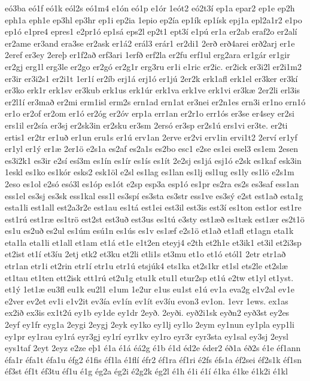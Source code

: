 {eó3ba
eó1f
eó1k
eól2s
eó1m4
e1ón
eó1p
e1ór
1eót2
eó2t3í
ep1a
epar2
ep1e
ep2h
eph1a
eph1e
ep3hl
ep3hr
ep1i
ep2ia
1epio
ep2ía
ep1ík
ep1ísk
epj1a
epl2a1r2
e1po
ep1ó
e1pre4
epres1
e2pr1ó
ep1sá
eps2l
ep2t1
ept3í
e1pú
er1a
er2ab
eraf2o
er2alí
er2ame
er3and
era3se
er2ask
er1á2
erál3
erár1
er2di1
2erð
erð4arei
erð2arj
er1e
2eref
er3ey
2ereþ
er1f2að
erf3ari
1erfð
erf2la
er2fu
erf1ul
erg2ara
er1gár
er1gir
er2gj
erg1l
erg3le
er2go
er2gó
er2g1r
erg3ru
er1i
e1ric
er2ic.
er2ick
er3i2l
er2i1m2
er3ir
er3i2s1
er2i1t
1er1í
er2íb
erj1á
erj1ó
er1jú
2er2k
erk1afl
erk1el
er3ker
er3kí
er3ko
erk1r
erk1sv
er3kub
erk1us
erk1úr
erk1va
erk1ve
erk1vi
er3kæ
2er2li
erl3is
er2l1í
er3mað
er2mi
erm1isl
erm2s
ern1ad
ern1at
er3nei
er2n1es
ern3i
er1no
ern1ó
er1o
er2of
er2om
er1ó
er2óg
er2óv
erp1a
err1an
er2r1o
err1ós
er3se
er4sey
er2si
ers1il
er2sía
er3sj
er2sk3in
er2sku
er3sm
2ersó
er3sp
er2s1ú
ers1vi
er3te.
er2ti
ertis1
er2tr
er1uð
er1un
eru1s
er1ú
erv1an
2erve
er2vi
erv1in
ervi1t2
2erví
er1yf
er1yl
er1ý
er1æ
2er1ö
e2s1a
es2af
es2a1s
es2bo
esc1
e2se
es1ei
esel3
es1em
2esen
es3i2k1
es3ir
e2sí
esí3m
es1ín
es1ír
es1ís
es1ít
2e2sj
es1já
esj1ó
e2sk
es1kaf
esk3in
1eskl
es1ko
es1kór
esks2
esk1öl
e2sl
es1lag
es1lan
es1lj
esl1ug
es1ly
es1lö
e2s1m
2eso
es1ol
e2só
esó3l
es1óp
es1ót
e2sp
esp3a
esp1ó
es1pr
es2ra
es2s
es3saf
ess1an
ess1el
es3sj
es3sk
ess1kal
ess1l
es3spí
es3sta
es3str
ess1ve
es3sý
e2st
est1að
esta1g
esta1li
est1all
est2a3r2e
est1au
es1tá
est1ei
est3il
est3is
est3í
es1ton
est1or
est1re
est1rú
est1ræ
es1trö
est2st
est3uð
est3us
es1tú
e3sty
est1æð
es1tæk
est1ær
es2t1ö
es1u
es2uð
es2ul
es1úm
esú1n
es1ús
es1v
es1æf
e2s1ö
et1að
et1afl
et1agn
eta1k
eta1la
eta1li
et1all
et1am
et1á
et1e
e1t2en
eteyj4
e2th
et2h1e
et3ik1
et3il
et2i3sp
et2ist
et1í
et3íu
2etj
etk2
et3ku
et2li
etli1s
et3mu
et1o
et1ó
etól1
2etr
etr1að
etr1an
etr1i
et2rin
etr1í
etr1u
etr1ú
etsjúk4
ets1ka
et2s1kr
et1sl
ets2le
et2slæ
et1tau
et1ten
ett2isk
ett1rú
et2u1g
etu1k
etu1l
etur2sp
et1ú
e2tw
et1yl
et1yst.
et1ý
1et1æ
eu3fl
eu1k
eu2l1
e1um
1e2ur
e1us
eu1st
e1ú
ev1a
eva2g
e1v2al
ev1e
e2ver
ev2et
ev1i
e1v2it
ev3ía
ev1ín
ev1ít
ev3íu
evon3
ev1on.
1evr
1ews.
ex1as
ex2ið
ex3is
ex1t2ú
ey1b
ey1de
ey1dr
2eyð.
2eyði.
eyð2i1sk
eyðn2
eyð3st
ey2es
2eyf
ey1fr
eyg1a
2eygi
2eygj
2eyk
ey1ko
ey1lj
ey1lo
2eym
ey1nun
ey1pla
eyp1li
ey1pr
ey1rau
ey1rá
eyr3gj
ey1rí
eyr1kv
ey1ro
eyr3r
eyr3sta
ey1sal
ey3sj
2eysl
eys1taf
2eyt
2eyz
e2ze
eþ1
é1a
é1á
éá2g
é1b
é1d
éd2e
éder2
éð1a
éð2s
é1e
éf1ann
éfa1r
éfa1t
éfa1u
éfg2
é1fis
éf1la
é1flí
éfr2
éf1ra
éf1ri
é2fs
éfs1a
éf2sei
éf2s1k
éf1sn
éf3st
éf1t
éf3tu
éf1u
é1g
ég2a
ég2i
é2g2k
ég2l
é1h
é1i
é1í
é1ka
é1ke
é1k2i
é1kl
}

